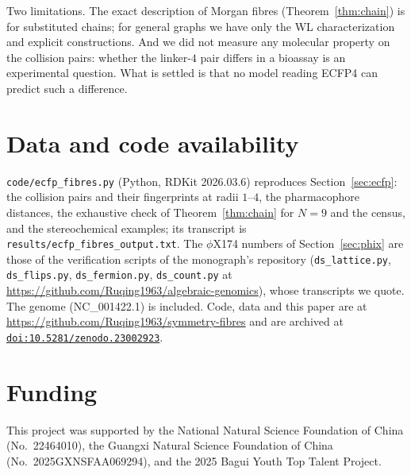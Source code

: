 \documentclass[11pt]{article}
\newcommand{\doi}[1]{\href{https://doi.org/#1}{\nolinkurl{doi:#1}}}
\theoremstyle{plain}
\theoremstyle{definition}
\theoremstyle{remark}
\begin{document}
Two limitations. The exact description of Morgan fibres (Theorem~\ref{thm:chain}) is for substituted chains; for
general graphs we have only the WL characterization and explicit constructions. And we did not measure any
molecular property on the collision pairs: whether the linker-$4$ pair differs in a bioassay is an experimental
question. What is settled is that no model reading ECFP4 can predict such a difference.

\section*{Data and code availability}
\sloppy
\texttt{code/ecfp\_fibres.py} (Python, RDKit 2026.03.6) reproduces Section~\ref{sec:ecfp}: the collision pairs and
their fingerprints at radii $1$--$4$, the pharmacophore distances, the exhaustive check of
Theorem~\ref{thm:chain} for $N=9$ and the census, and the stereochemical examples; its transcript is
\texttt{results/ecfp\_fibres\_output.txt}. The $\phi$X174 numbers of Section~\ref{sec:phix} are those of the
verification scripts of the monograph's repository (\texttt{ds\_lattice.py}, \texttt{ds\_flips.py},
\texttt{ds\_fermion.py}, \texttt{ds\_count.py} at \url{https://github.com/Ruqing1963/algebraic-genomics}), whose
transcripts we quote. The genome (NC\_001422.1) is included. Code, data and this paper are at
\url{https://github.com/Ruqing1963/symmetry-fibres} and are archived at \doi{10.5281/zenodo.23002923}.

\section*{Funding}
This project was supported by the National Natural Science Foundation of China (No.~22464010), the
Guangxi Natural Science Foundation of China (No.~2025GXNSFAA069294), and the 2025 Bagui Youth Top
Talent Project.
\end{document}
